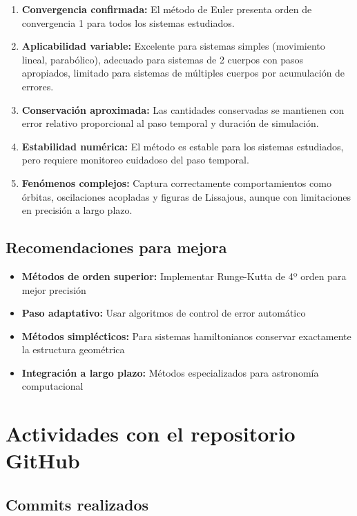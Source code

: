 \documentclass{article}
\begin{document}
	\begin{enumerate}
		\item \textbf{Convergencia confirmada:} El método de Euler presenta orden de convergencia 1 para todos los sistemas estudiados.
		
		\item \textbf{Aplicabilidad variable:} Excelente para sistemas simples (movimiento lineal, parabólico), adecuado para sistemas de 2 cuerpos con pasos apropiados, limitado para sistemas de múltiples cuerpos por acumulación de errores.
		
		\item \textbf{Conservación aproximada:} Las cantidades conservadas se mantienen con error relativo proporcional al paso temporal y duración de simulación.
		
		\item \textbf{Estabilidad numérica:} El método es estable para los sistemas estudiados, pero requiere monitoreo cuidadoso del paso temporal.
		
		\item \textbf{Fenómenos complejos:} Captura correctamente comportamientos como órbitas, oscilaciones acopladas y figuras de Lissajous, aunque con limitaciones en precisión a largo plazo.
	\end{enumerate}
	
	\subsection{Recomendaciones para mejora}
	
	\begin{itemize}
		\item \textbf{Métodos de orden superior:} Implementar Runge-Kutta de 4º orden para mejor precisión
		\item \textbf{Paso adaptativo:} Usar algoritmos de control de error automático
		\item \textbf{Métodos simplécticos:} Para sistemas hamiltonianos conservar exactamente la estructura geométrica
		\item \textbf{Integración a largo plazo:} Métodos especializados para astronomía computacional
	\end{itemize}

	\section{Actividades con el repositorio GitHub}
	
	\subsection{Commits realizados}
	
\end{document}
